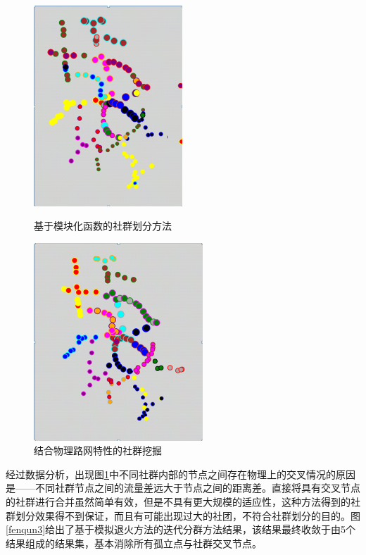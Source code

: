 				\begin{figure}
				\begin{minipage}{0.5\linewidth}
					\centering
					\includegraphics[width=2.2in]{picture/liuliangbianquan}
					\caption{基于模块化函数的社群划分方法}
					\label{fenqun1}
				\end{minipage}%
				\begin{minipage}{0.5\linewidth}
					\centering
					\includegraphics[width=2.5in]{picture/xiaochuguli}
					\caption{结合物理路网特性的社群挖掘}
					\label{fenqun2}
				\end{minipage}
				\end{figure}

		经过数据分析，出现图\ref{fenqun2}中不同社群内部的节点之间存在物理上的交叉情况的原因是——不同社群节点之间的流量差远大于节点之间的距离差。直接将具有交叉节点的社群进行合并虽然简单有效，但是不具有更大规模的适应性，这种方法得到的社群划分效果得不到保证，而且有可能出现过大的社团，不符合社群划分的目的。图\ref{fenqun3}给出了基于模拟退火方法的迭代分群方法结果，该结果最终收敛于由5个结果组成的结果集，基本消除所有孤立点与社群交叉节点。


